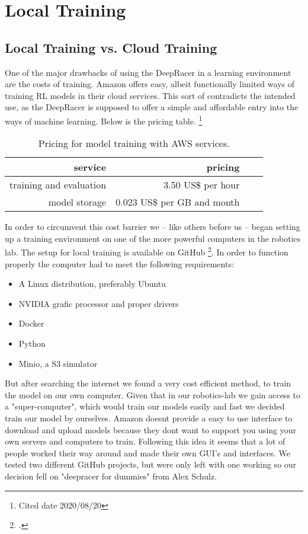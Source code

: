 \chapter{Local Training}

\section{Local Training vs. Cloud Training}
One of the major drawbacks of using the DeepRacer in a learning environment are the costs of training. Amazon offers easy, albeit functionally limited ways of training RL models in their cloud services. This sort of contradicts the intended use, as the DeepRacer is supposed to offer a simple and affordable entry into the ways of machine learning. Below is the pricing table. \footnote{Cited date 2020/08/20}
 \begin{table}
 \caption{Pricing for model training with AWS services.}
 \label{tab:services}
 \centering
 \setlength{\tabcolsep}{5mm}
 \def\arraystretch{1.25}
 \begin{tabular}{|r|r|c|c|}
 \hline
 \textbf{service} & \textbf{pricing} \\
 \hline\hline
 training and evaluation & 3.50 US\$ per hour \\
 \hline
 model storage & 0.023 US\$ per GB and month \\
 \hline
 \end{tabular}
 \end{table}
 In order to circumvent this cost barrier we -- like others before us -- began setting up a training environment on one of the more powerful computers in the robotics lab.
 The setup for local training is available on GitHub \footcite{https://github.com/aws-deepracer-community/deepracer}. In order to function properly the computer had to meet the following requirements:
 \begin{itemize}
 \item A Linux distribution, preferably Ubuntu
 \item NVIDIA grafic processor and proper drivers
 \item Docker
 \item Python
 \item Minio, a S3 simulator
 \end{itemize}
But after searching the internet we found a very cost efficient method, to train the model on our own computer. Given that in our robotics-lab we gain access to a "super-computer", which would train our models easily and fast we decided train our model by ourselves. Amazon doesnt provide a easy to use interface to download and upload models because they dont want to support you using your own servers and computers to train. Following this idea it seems that a lot of people worked their way around and made their own GUI's and interfaces. We tested two different GitHub projects, but were only left with one working so our decision fell on "deepracer for dummies" from Alex Schulz. 

